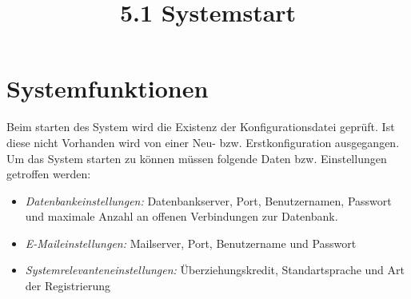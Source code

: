 \chapter{Systemfunktionen}

	\title{5.1 Systemstart}
		Beim starten des System wird die Existenz der Konfigurationsdatei geprüft. Ist diese nicht Vorhanden wird von einer Neu- bzw. Erstkonfiguration ausgegangen. Um das System starten zu können müssen folgende Daten bzw. Einstellungen getroffen werden:
		\begin{itemize}
			\item \emph{Datenbankeinstellungen:} Datenbankserver, Port, Benutzernamen, Passwort und maximale Anzahl an offenen Verbindungen zur Datenbank.
			\item \emph{E-Maileinstellungen:} Mailserver, Port, Benutzername und Passwort
			\item \emph{Systemrelevanteneinstellungen:} Überziehungskredit, Standartsprache und Art der Registrierung
		\end{itemize}
		
